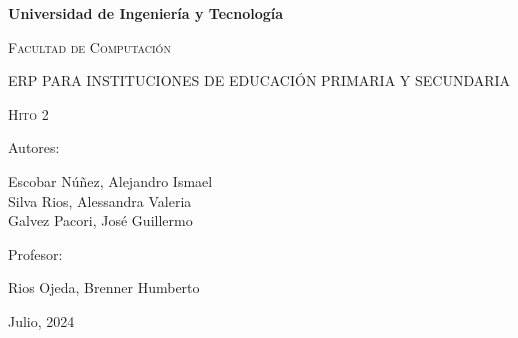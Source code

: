 \begin{titlepage}
	\centering
	\bfseries\LARGE{Universidad de Ingeniería y Tecnología} \par
	\vspace{1cm}
	\Large\scshape{Facultad de Computación} \par
	\vspace{2cm}
	\scshape\Huge{ERP PARA INSTITUCIONES DE EDUCACIÓN PRIMARIA Y SECUNDARIA} \par
	\vspace{2cm}
	\scshape\Large{Hito 2} \par
	\vfill
	\Large{Autores:} \par
	\Large Escobar Núñez, Alejandro Ismael \\
	Silva Rios, Alessandra Valeria \\
	Galvez Pacori, José Guillermo \par
	\vfill
	\Large Profesor: \par
	\Large Rios Ojeda, Brenner Humberto \par
	\vfill
	\Large{Julio, 2024} \par
\end{titlepage}